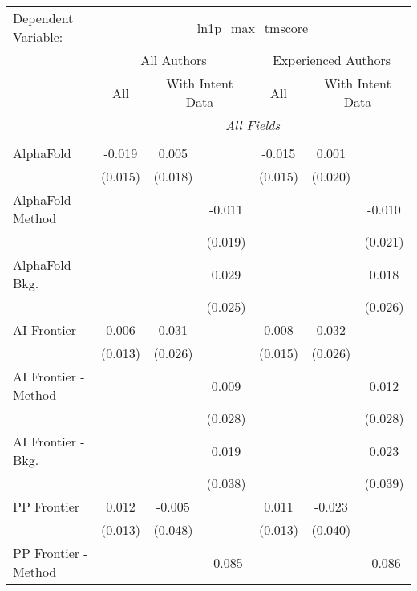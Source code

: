 \begingroup
\centering
\begin{tabular}{lcccccc}
   \tabularnewline \midrule \midrule
   Dependent Variable: & \multicolumn{6}{c}{ln1p\_max\_tmscore}\\
 & \multicolumn{3}{c}{All Authors} & \multicolumn{3}{c}{Experienced Authors} \\
\cmidrule(lr){2-4} \cmidrule(lr){5-7}
 & \multicolumn{1}{c}{All} & \multicolumn{2}{c}{With Intent Data} & \multicolumn{1}{c}{All} & \multicolumn{2}{c}{With Intent Data} \\
\cmidrule(lr){2-2} \cmidrule(lr){3-4} \cmidrule(lr){5-5} \cmidrule(lr){6-7}
 & \multicolumn{6}{c}{\textit{All Fields}} \\ \\
   AlphaFold            & -0.019  & 0.005   &         & -0.015  & 0.001   &   \\   
                        & (0.015) & (0.018) &         & (0.015) & (0.020) &   \\   
   AlphaFold - Method   &         &         & -0.011  &         &         & -0.010\\   
                        &         &         & (0.019) &         &         & (0.021)\\   
   AlphaFold - Bkg.     &         &         & 0.029   &         &         & 0.018\\   
                        &         &         & (0.025) &         &         & (0.026)\\   
   AI Frontier          & 0.006   & 0.031   &         & 0.008   & 0.032   &   \\   
                        & (0.013) & (0.026) &         & (0.015) & (0.026) &   \\   
   AI Frontier - Method &         &         & 0.009   &         &         & 0.012\\   
                        &         &         & (0.028) &         &         & (0.028)\\   
   AI Frontier - Bkg.   &         &         & 0.019   &         &         & 0.023\\   
                        &         &         & (0.038) &         &         & (0.039)\\   
   PP Frontier          & 0.012   & -0.005  &         & 0.011   & -0.023  &   \\   
                        & (0.013) & (0.048) &         & (0.013) & (0.040) &   \\   
   PP Frontier - Method &         &         & -0.085  &         &         & -0.086\\   

\end{tabular}
